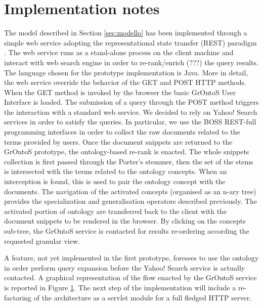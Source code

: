 
\section{Implementation notes}

The model described in Section \ref{sec:modello} has been implemented through a simple web service adopting the representational state transfer (REST) paradigm \cite{REST}. The web service runs as a stand-alone process on the client machine and interact with web search engine in order to re-rank/enrich (???) the query results. The language chosen for the prototype implementation is Java.
More in detail, the web service override the behavior of the GET and POST HTTP methods. When the GET method is invoked by the browser the basic GrOntoS User Interface is loaded. The submission of a query through the POST method triggers the interaction with a standard web service. 
We decided to rely on Yahoo! Search services in order to satisfy the queries. In particular, we use the BOSS REST-full programming interfaces \cite{boss_webRef} in order to collect the raw documents related to the terms provided by users.
Once the document snippets are returned to the GrOntoS prototype, the ontology-based re-rank is enacted. The whole snippets collection is first passed through the Porter's stemmer, then the set of the stems is intersected with the terms related to the ontology concepts. When an interception is found, this is used to pair the ontology concept with the documents. The navigation of the activated concepts (organised as an n-ary tree) provides the specialization and generalisation operators described previously.
The activated portion of ontology are transferred back to the client with the document snippets to be rendered in the browser. By clicking on the concepts sub-tree, the GrOntoS service is contacted for results re-ordering according the requested granular view.

A feature, not yet implemented in the first prototype, foresees to use the ontology in order perform query expansion before the Yahoo! Search service is actually contacted. A graphical representation of the flow enacted by the GrOntoS service is reported in Figure \ref{fig:grontos_arch}. 
The next step of the implementation will include a re-factoring of the architecture as a servlet module for a full fledged HTTP server.
 
\begin{figure}[Ht]

\label{fig:grontos_arch}
\end{figure}
